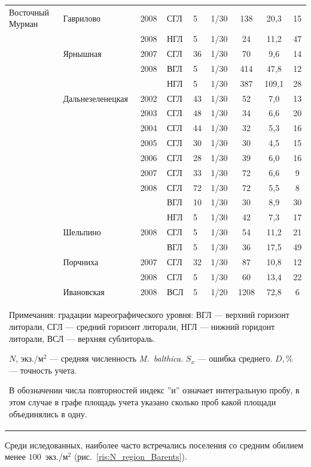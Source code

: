 \begin{footnotesize}
\begin{longtable}{|p{2cm}|p{3cm}|p{1cm}|p{2cm}|p{1.5cm}|p{1cm}|*{3}{c|}}
	Восточный Мурман & Гаврилово & 2008 & СГЛ & 5 & 1/30 & 138 & 20,3 & 15
		\\ \cline{4-9}
		 &  & 2008 & НГЛ & 5 & 1/30 & 24 & 11,2 & 47
		\\ \cline{2-9}
		 & Ярнышная & 2007 & СГЛ & 36 & 1/30 & 70 & 9,6 & 14
		\\ \cline{3-9}
		 &  & 2008 & ВГЛ & 5 & 1/30 & 414 & 47,8 & 12
		\\ \cline{4-9}
		 &  & & НГЛ & 5 & 1/30 & 387 & 109,1 & 28
		\\ \cline{2-9}
		 & Дальнезеленецкая & 2002 & СГЛ & 43 & 1/30 & 52 & 7,0 & 13
		\\ \cline{3-9}
		 &  & 2003 & СГЛ & 48 & 1/30 & 34 & 6,6 & 20
		\\ \cline{3-9}
		 &  & 2004 & СГЛ & 44 & 1/30 & 32 & 5,3 & 16
		\\ \cline{3-9}
		 &  & 2005 & СГЛ & 30 & 1/30 & 30 & 4,5 & 15
		\\ \cline{3-9}
		 &  & 2006 & СГЛ & 28 & 1/30 & 39 & 6,0 & 16
		\\ \cline{3-9}
		 &  & 2007 & СГЛ & 33 & 1/30 & 72 & 6,6 & 9
		\\ \cline{3-9}
		 &  & 2008 & СГЛ & 72 & 1/30 & 72 & 5,5 & 8
		\\ \cline{4-9}
		 &  &  & ВГЛ & 10 & 1/30 & 30 & 8,9 & 30
		\\ \cline{4-9}
		 &  &  & НГЛ & 5 & 1/30 & 42 & 7,3 & 17
		\\ \cline{2-9}
		 & Шельпино & 2008 & СГЛ & 5 & 1/30 & 54 & 11,2 & 21
		\\ \cline{4-9}
		 &  &  & ВГЛ & 5 & 1/30 & 36 & 17,5 & 49
		\\ \cline{2-9}
		 & Порчниха & 2007 & СГЛ & 32 & 1/30 & 87 & 10,8 & 12
		\\ \cline{3-9}
		 &  & 2008 & СГЛ & 5 & 1/30 & 60 & 13,4 & 22
		\\ \cline{2-9}
		 & Ивановская & 2008 & ВСЛ & 5 & 1/20 & 1208 & 72,8 & 6
		\\ \hline
	\multicolumn{9}{p{16cm}}{Примечания: градации мареографического уровня: ВГЛ --- верхний горизонт литорали, СГЛ --- средний 	горизонт литорали, НГЛ --- нижний горидонт литорали, ВСЛ --- верхняя сублитораль. 

	$N$, экз./м$^2$ --- средняя численность {\it M.~balthica}. 
	$S_x$ --- ошибка среднего.
	 $D, \%$ ---  точность учета.
	
	В обозначении числа повторностей индекс ''и'' означает интегральную пробу, в этом случае в графе площадь учета указано сколько проб какой площади 	объединялись в одну.}
	\end{longtable}
	\end{footnotesize}
%
Среди иследованных, наиболее часто встречались поселения со средним обилием менее $100$~экз./м$^2$ (рис.~\ref{ris:N_region_Barents}).

